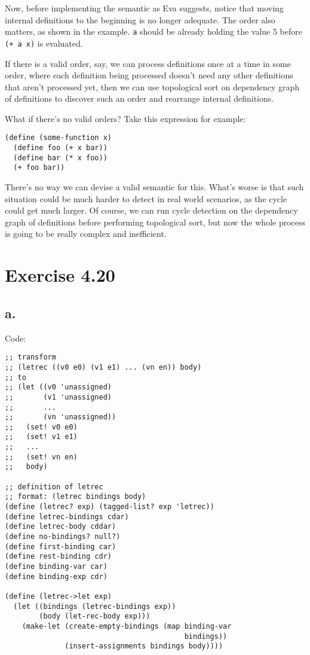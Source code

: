 \documentclass[../main.tex]{subfiles}
\begin{document}
Now, before implementing the semantic as Eva suggests, notice that moving internal definitions to the beginning is no longer adequate. The order also matters, as shown in the example. \lstinline{a} should be already holding the value 5 before \lstinline{(+ a x)} is evaluated.

If there is a valid order, say, we can process definitions once at a time in some order, where each definition being processed doesn't need any other definitions that aren't processed yet, then we can use topological sort on dependency graph of definitions to discover such an order and rearrange internal definitions.

What if there's no valid orders? Take this expression for example:

\begin{lstlisting}
(define (some-function x)
  (define foo (+ x bar))
  (define bar (* x foo))
  (+ foo bar))
\end{lstlisting}

There's no way we can devise a valid semantic for this. What's worse is that such situation could be much harder to detect in real world scenarios, as the cycle could get much larger. Of course, we can run cycle detection on the dependency graph of definitions before performing topological sort, but now the whole process is going to be really complex and inefficient.

\section{Exercise 4.20}

\subsection{a.}

Code:

\begin{lstlisting}
;; transform
;; (letrec ((v0 e0) (v1 e1) ... (vn en)) body)
;; to
;; (let ((v0 'unassigned)
;;       (v1 'unassigned)
;;       ...
;;       (vn 'unassigned))
;;   (set! v0 e0)
;;   (set! v1 e1)
;;   ...
;;   (set! vn en)
;;   body)

;; definition of letrec
;; format: (letrec bindings body)
(define (letrec? exp) (tagged-list? exp 'letrec))
(define letrec-bindings cdar)
(define letrec-body cddar)
(define no-bindings? null?)
(define first-binding car)
(define rest-binding cdr)
(define binding-var car)
(define binding-exp cdr)

(define (letrec->let exp)
  (let ((bindings (letrec-bindings exp))
        (body (let-rec-body exp)))
    (make-let (create-empty-bindings (map binding-var
                                          bindings))
              (insert-assignments bindings body))))
\end{lstlisting}
\end{document}
